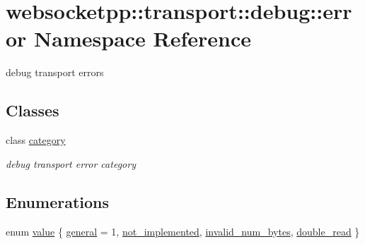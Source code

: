\hypertarget{namespacewebsocketpp_1_1transport_1_1debug_1_1error}{}\section{websocketpp\+:\+:transport\+:\+:debug\+:\+:error Namespace Reference}
\label{namespacewebsocketpp_1_1transport_1_1debug_1_1error}


debug transport errors  


\subsection*{Classes}
\begin{DoxyCompactItemize}
\item 
class \hyperlink{classwebsocketpp_1_1transport_1_1debug_1_1error_1_1category}{category}
\begin{DoxyCompactList}\small\item\em debug transport error category \end{DoxyCompactList}\end{DoxyCompactItemize}
\subsection*{Enumerations}
\begin{DoxyCompactItemize}
\item 
enum \hyperlink{namespacewebsocketpp_1_1transport_1_1debug_1_1error_a5ee6badaa3c5ebb600c4062394fac69c}{value} \{ \hyperlink{namespacewebsocketpp_1_1transport_1_1debug_1_1error_a5ee6badaa3c5ebb600c4062394fac69cad6cbd99e4f73d21c82b0bb9cf2648028}{general} = 1, 
\hyperlink{namespacewebsocketpp_1_1transport_1_1debug_1_1error_a5ee6badaa3c5ebb600c4062394fac69ca01d1c00e0b91aa7a9146a01ca5f9e709}{not\+\_\+implemented}, 
\hyperlink{namespacewebsocketpp_1_1transport_1_1debug_1_1error_a5ee6badaa3c5ebb600c4062394fac69ca3a8b241e170e6017a9c504d43416cf97}{invalid\+\_\+num\+\_\+bytes}, 
\hyperlink{namespacewebsocketpp_1_1transport_1_1debug_1_1error_a5ee6badaa3c5ebb600c4062394fac69caba5273a44b6f09d98d59029c58f8f4b4}{double\+\_\+read}
 \}
\end{DoxyCompactItemize}
